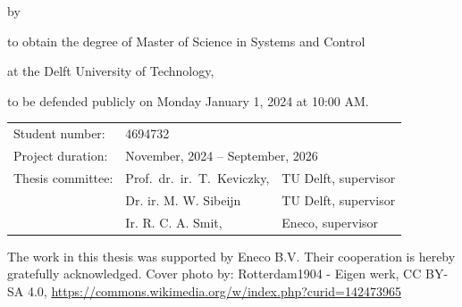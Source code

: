\newpage

\begin{titlepage}

\begin{center}

{\makeatletter
\largetitlestyle\fontsize{45}{45}\selectfont\@title
\makeatother}

{\makeatletter
\ifdefvoid{\@subtitle}{}{\bigskip\titlestyle\fontsize{20}{20}\selectfont\@subtitle}
\makeatother}

\bigskip
\bigskip

by

\bigskip
\bigskip

{\makeatletter
\largetitlestyle\fontsize{25}{25}\selectfont\@author
\makeatother}

\bigskip
\bigskip

to obtain the degree of Master of Science in Systems and Control

at the Delft University of Technology,

to be defended publicly on Monday January 1, 2024 at 10:00 AM.

\vfill

\begin{tabular}{lll}
    Student number: & 4694732 \\
    Project duration: & \multicolumn{2}{l}{November, 2024 -- September, 2026} \\
    Thesis committee: & Prof.\ dr.\ ir.\ T.\ Keviczky, & TU Delft, supervisor \\
        & Dr. ir. M. W. Sibeijn & TU Delft, supervisor \\
        & Ir. R. C. A. Smit, & Eneco, supervisor \\
\end{tabular}

The work in this thesis was supported by Eneco B.V. Their cooperation is hereby gratefully acknowledged.
\vfill
\bigskip
\bigskip
\bigskip
\bigskip
Cover photo by: Rotterdam1904 - Eigen werk, CC BY-SA 4.0, \url{https://commons.wikimedia.org/w/index.php?curid=142473965}


\end{center}
\end{titlepage}
